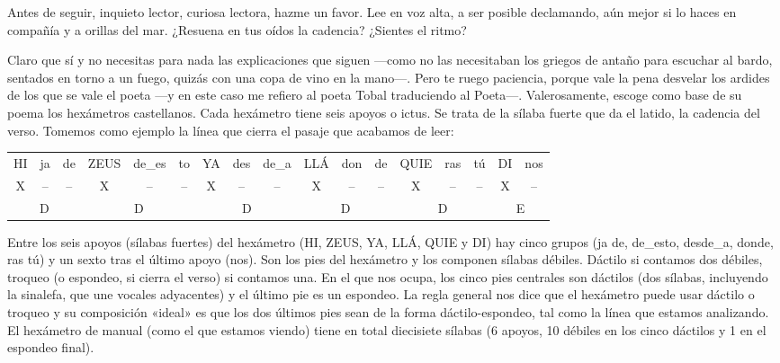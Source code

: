 \documentclass[11pt,a4paper]{article}
\begin{document}
Antes de seguir, inquieto lector, curiosa lectora, hazme un favor. Lee en voz alta, a ser posible declamando, aún mejor si lo haces en compañía y a orillas del mar. ¿Resuena en tus oídos la cadencia? ¿Sientes el ritmo?

Claro que sí y no necesitas para nada las explicaciones que siguen ---como no las necesitaban los griegos de antaño para escuchar al bardo, sentados en torno a un fuego, quizás con una copa de vino en la mano---. Pero te ruego paciencia, porque vale la pena desvelar los ardides de los que se vale el poeta ---y en este caso me refiero al poeta Tobal traduciendo al Poeta---. Valerosamente, escoge como base de su poema los hexámetros castellanos. Cada hexámetro tiene seis apoyos o ictus. Se trata de la sílaba fuerte que da el latido, la cadencia del verso. Tomemos como ejemplo la línea que cierra el pasaje que acabamos de leer:

\begin{center}
\small\setlength{\tabcolsep}{3pt}
\begin{tabular}{ccc|ccc|ccc|ccc|ccc|cc}
HI & ja & de & ZEUS & de\_es & to & YA & des & de\_a & LLÁ & don & de & QUIE & ras & tú & DI & nos \\
X & -- & -- & X & -- & -- & X & -- & -- & X & -- & -- & X & -- & -- & X & -- \\
\multicolumn{3}{c|}{D} & \multicolumn{3}{c|}{D} & \multicolumn{3}{c|}{D} & \multicolumn{3}{c|}{D} & \multicolumn{3}{c|}{D} & \multicolumn{2}{c}{E} \\
\end{tabular}
\end{center}

Entre los seis apoyos (sílabas fuertes) del hexámetro (HI, ZEUS, YA, LLÁ, QUIE y DI) hay cinco grupos (ja de, de\_esto, desde\_a, donde, ras tú) y un sexto tras el último apoyo (nos). Son los pies del hexámetro y los componen sílabas débiles. Dáctilo si contamos dos débiles, troqueo (o espondeo, si cierra el verso) si contamos una. En el que nos ocupa, los cinco pies centrales son dáctilos (dos sílabas, incluyendo la sinalefa, que une vocales adyacentes) y el último pie es un espondeo. La regla general nos dice que el hexámetro puede usar dáctilo o troqueo y su composición «ideal» es que los dos últimos pies sean de la forma dáctilo-espondeo, tal como la línea que estamos analizando. El hexámetro de manual (como el que estamos viendo) tiene en total diecisiete sílabas (6 apoyos, 10 débiles en los cinco dáctilos y 1 en el espondeo final).
\end{document}
